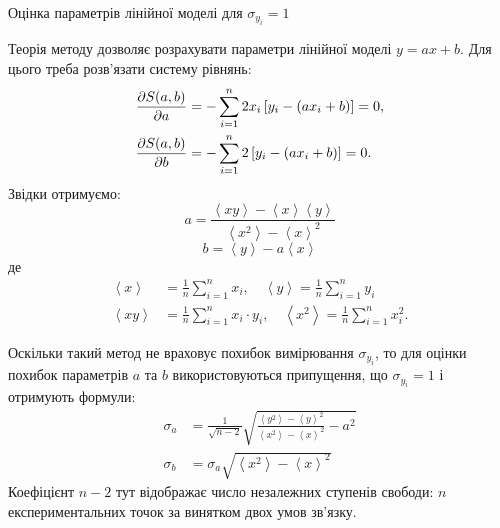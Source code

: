 \documentclass{LabBook}
\begin{document}
  \begin{More}{Оцінка параметрів лінійної моделі для $\sigma_{y_i} = 1$}

    Теорія методу дозволяє розрахувати параметри лінійної моделі $y = a x + b$. Для цього треба розв'язати систему рівнянь:
    \begin{align*}\label{}
      \frac{\partial S(a, b)}{\partial a} & = -\sum\limits_{i = 1}^n 2x_i\left[ y_i - (a x_i + b) \right] = 0, \\
      \frac{\partial S(a, b)}{\partial b} & = -\sum\limits_{i = 1}^n 2\left[ y_i - (a x_i + b) \right] = 0.    \\
    \end{align*}
    Звідки отримуємо:
    \begin{equation}\label{MLSa}
      a = \frac{{\left\langle xy \right\rangle  - \left\langle x \right\rangle \left\langle y \right\rangle }}{{\left\langle x^2 \right\rangle  -\left\langle x \right\rangle^2}}
    \end{equation}
    \begin{equation}\label{MLSb}
      b = \left\langle y \right\rangle  - a\left\langle x \right\rangle
    \end{equation}
    де
    \begin{align*}
      \left\langle x \right\rangle  & = \frac{1}{n}\sum\limits_{i = 1}^n x_i, \quad \left\langle y \right\rangle = \frac{1}{n}\sum\limits_{i = 1}^n y_i               \\
      \left\langle xy \right\rangle & = \frac{1}{n}\sum\limits_{i = 1}^n x_i\cdot y_i, \quad \left\langle x^2 \right\rangle = \frac{1}{n}\sum\limits_{i = 1}^n x^2_i.
    \end{align*}

    Оскільки такий метод не враховує похибок вимірювання $\sigma_{y_i}$, то для оцінки похибок параметрів $a$ та $b$ використовуються припущення, що $\sigma_{y_i} = 1$  і отримують формули:
    \begin{align}
      \sigma_a & = \frac{1}{\sqrt{n - 2}}\sqrt{\frac{\left\langle y^2 \right\rangle  -\left\langle y \right\rangle^2}{\left\langle x^2 \right\rangle  -\left\langle x \right\rangle^2} - a^2} \\
      \sigma_b & = \sigma_a \sqrt{\left\langle x^2 \right\rangle  -\left\langle x \right\rangle^2}
    \end{align}
    Коефіцієнт $n - 2$ тут відображає число незалежних ступенів свободи: $n$ експериментальних точок за винятком двох умов  зв'язку.
  \end{More}
\end{document}
